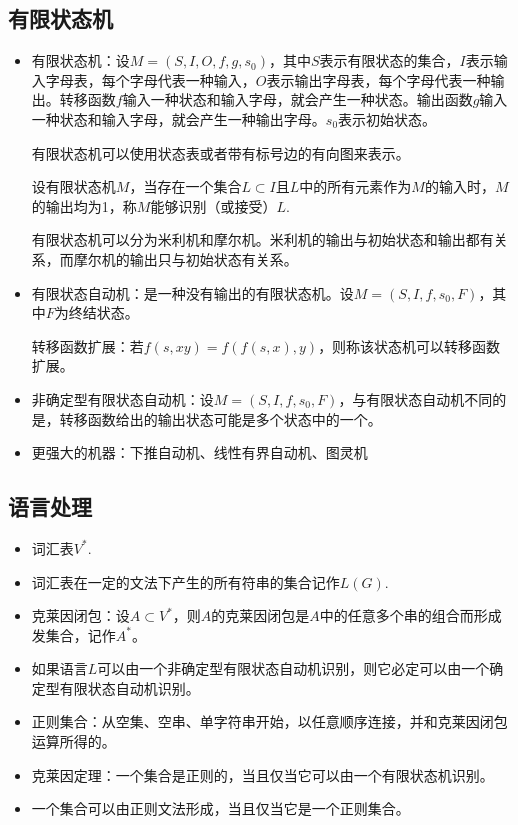 \subsection{有限状态机}
\begin{itemize}
    \item 有限状态机：设$M = (S, I, O, f, g, s_0)$，其中$S$表示有限状态的集合，$I$表示输入字母表，每个字母代表一种输入，$O$表示输出字母表，每个字母代表一种输出。转移函数$f$输入一种状态和输入字母，就会产生一种状态。输出函数$g$输入一种状态和输入字母，就会产生一种输出字母。$s_0$表示初始状态。

    有限状态机可以使用状态表或者带有标号边的有向图来表示。

    设有限状态机$M$，当存在一个集合$L \subset I$且$L$中的所有元素作为$M$的输入时，$M$的输出均为1，称$M$能够识别（或接受）$L$.
    
    有限状态机可以分为米利机和摩尔机。米利机的输出与初始状态和输出都有关系，而摩尔机的输出只与初始状态有关系。
    
    \item 有限状态自动机：是一种没有输出的有限状态机。设$M = (S, I, f, s_0, F)$，其中$F$为终结状态。

    转移函数扩展：若$f(s, xy) = f(f(s,x),y)$，则称该状态机可以转移函数扩展。

    \item 非确定型有限状态自动机：设$M = (S, I, f, s_0, F)$，与有限状态自动机不同的是，转移函数给出的输出状态可能是多个状态中的一个。
    
    \item 更强大的机器：下推自动机、线性有界自动机、图灵机
\end{itemize}

\subsection{语言处理}
\begin{itemize}
    \item 词汇表$V^*$.
    \item 词汇表在一定的文法下产生的所有符串的集合记作$L(G)$.
    \item 克莱因闭包：设$A \subset V^*$，则$A$的克莱因闭包是$A$中的任意多个串的组合而形成发集合，记作$A^*$。
    \item 如果语言$L$可以由一个非确定型有限状态自动机识别，则它必定可以由一个确定型有限状态自动机识别。
    \item 正则集合：从空集、空串、单字符串开始，以任意顺序连接，并和克莱因闭包运算所得的。
    \item 克莱因定理：一个集合是正则的，当且仅当它可以由一个有限状态机识别。
    \item 一个集合可以由正则文法形成，当且仅当它是一个正则集合。
\end{itemize}


